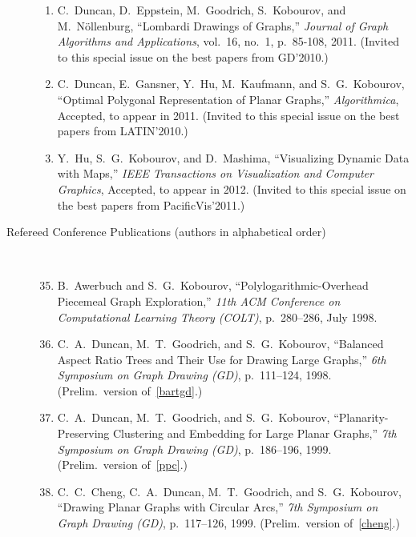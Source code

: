 \documentclass[10pt]{article}
\begin{document}
\begin{description}
\begin{enumerate}
\item C.~Duncan, D.~Eppstein, M.~Goodrich, S.~Kobourov, and
  M.~N{\"o}llenburg, ``Lombardi Drawings of Graphs,''  {\em Journal of
    Graph Algorithms and Applications}, vol.~16, no.~1, p.~85-108,  2011. (Invited to this special issue on the best papers from
  GD'2010.)

\item C.~Duncan, E.~Gansner, Y.~Hu, M.~Kaufmann, and S.~G.~Kobourov, ``Optimal Polygonal Representation of Planar Graphs,'' {\em Algorithmica}, Accepted, to appear in 2011. (Invited to this special issue on the best papers from LATIN'2010.)


\item Y.~Hu, S.~G.~Kobourov, and D.~Mashima, ``Visualizing Dynamic
  Data with Maps,'' 
{\em IEEE Transactions on Visualization and Computer Graphics}, Accepted, to appear in 2012. (Invited to this special issue on the best papers from PacificVis'2011.)

\end{enumerate}






\item [Refereed Conference Publications (authors in alphabetical order)]\

\begin{enumerate}
\setcounter{enumi}{34}
\item 
B.~Awerbuch and S.~G.~Kobourov, ``Polylogarithmic-Overhead Piecemeal
Graph Exploration,'' {\em 11th ACM Conference on
Computational Learning Theory (COLT)}, p.~280--286, July 1998.

\item 
C.~A.~Duncan, M.~T.~Goodrich, and S.~G.~Kobourov, ``Balanced Aspect
Ratio Trees and Their Use for Drawing Large Graphs,'' {\em 6th Symposium on Graph Drawing (GD)}, p.~111--124, 1998. (Prelim.~version of~\ref{bartgd}.)

\item 
C.~A.~Duncan, M.~T.~Goodrich, and S.~G.~Kobourov,
``Planarity-Preserving Clustering and Embedding for Large Planar
Graphs,'' {\em 7th Symposium on Graph Drawing (GD)}, p.~186--196, 1999. (Prelim.~version of~\ref{ppc}.)

\item 
C.~C.~Cheng, C.~A.~Duncan, M.~T.~Goodrich, and S.~G.~Kobourov,
``Drawing Planar Graphs with Circular Arcs,'' {\em 7th
Symposium on Graph Drawing (GD)}, p.~117--126, 1999. (Prelim.~version of~\ref{cheng}.)


\end{enumerate}
\end{description}
\end{document}
